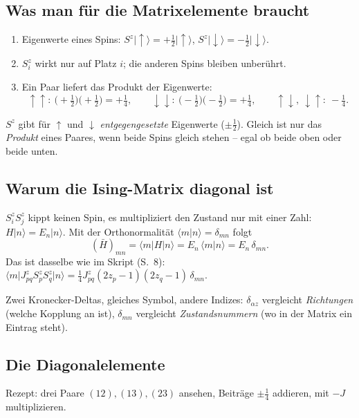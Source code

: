 \documentclass[11pt,a4paper]{article}
\newcommand{\ket}[1]{\lvert #1\rangle}
\newcommand{\bra}[1]{\langle #1\rvert}
\newcommand{\up}{{\uparrow}}
\newcommand{\dn}{{\downarrow}}
\newcommand{\Hbar}{\bar H}
\begin{document}
\subsection{Was man für die Matrixelemente braucht}

\begin{enumerate}[itemsep=2pt]
\item Eigenwerte eines Spins: $S^z\ket\up = +\tfrac12\ket\up$, \quad $S^z\ket\dn = -\tfrac12\ket\dn$.
\item $S^z_i$ wirkt nur auf Platz $i$; die anderen Spins bleiben unberührt.
\item Ein Paar liefert das Produkt der Eigenwerte:
\[
\up\up:\ \big(+\tfrac12\big)\big(+\tfrac12\big)=+\tfrac14,\qquad
\dn\dn:\ \big(-\tfrac12\big)\big(-\tfrac12\big)=+\tfrac14,\qquad
\up\dn,\ \dn\up:\ -\tfrac14 .
\]
\end{enumerate}

\begin{falle}
$S^z$ gibt für $\up$ und $\dn$ \emph{entgegengesetzte} Eigenwerte ($\pm\tfrac12$). Gleich ist nur das \emph{Produkt} eines Paares, wenn beide Spins gleich stehen -- egal ob beide oben oder beide unten.
\end{falle}

\subsection{Warum die Ising-Matrix diagonal ist}

$S^z_iS^z_j$ kippt keinen Spin, es multipliziert den Zustand nur mit einer Zahl: $H\ket n = E_n\ket n$. Mit der Orthonormalität $\langle m|n\rangle = \delta_{mn}$ folgt
\[
(\Hbar)_{mn} = \bra m H\ket n = E_n\,\langle m|n\rangle = E_n\,\delta_{mn} .
\]
Das ist dasselbe wie im Skript (S.~8): $\bra m J^z_{pq}S^z_pS^z_q\ket n = \tfrac14J^z_{pq}(2z_p-1)(2z_q-1)\,\delta_{mn}$.

\begin{merk}
Zwei Kronecker-Deltas, gleiches Symbol, andere Indizes: $\delta_{\alpha z}$ vergleicht \emph{Richtungen} (welche Kopplung an ist), $\delta_{mn}$ vergleicht \emph{Zustandsnummern} (wo in der Matrix ein Eintrag steht).
\end{merk}

\subsection{Die Diagonalelemente}

Rezept: drei Paare $(12),(13),(23)$ ansehen, Beiträge $\pm\tfrac14$ addieren, mit $-J$ multiplizieren.
\end{document}

